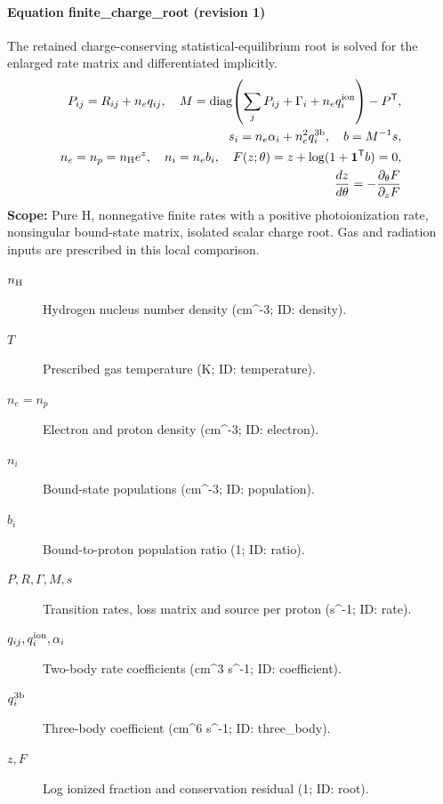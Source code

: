 \paragraph{Equation finite\_charge\_root (revision 1)}
The retained charge-conserving statistical-equilibrium root is solved for the enlarged rate matrix and differentiated implicitly.
\begin{equation}
\begin{aligned}
P_{ij}=R_{ij}+n_e q_{ij},\quad
 M=\operatorname{diag}\!\left(\sum_jP_{ij}+\Gamma_i+n_e q_i^{\rm ion}\right)-P^{\mathsf T},\\
s_i=n_e\alpha_i+n_e^2q_i^{\rm 3b},\quad b=M^{-1}s,\\
n_e=n_p=n_{\rm H}e^z,\quad n_i=n_e b_i,\quad F(z;\theta)=z+\log(1+\mathbf1^{\mathsf T}b)=0,\\
\frac{dz}{d\theta}=-\frac{\partial_\theta F}{\partial_z F}
\end{aligned}
\label{eq:escape.atom_5f_convergence:finite_5f_charge_5f_root:1}
\end{equation}
\noindent\textbf{Scope:} Pure H, nonnegative finite rates with a positive photoionization rate, nonsingular bound-state matrix, isolated scalar charge root. Gas and radiation inputs are prescribed in this local comparison.

\begin{description}
\item[$n_{\rm H}$] Hydrogen nucleus number density (cm\textasciicircum{}-3; ID: density).
\item[$T$] Prescribed gas temperature (K; ID: temperature).
\item[$n_e=n_p$] Electron and proton density (cm\textasciicircum{}-3; ID: electron).
\item[$n_i$] Bound-state populations (cm\textasciicircum{}-3; ID: population).
\item[$b_i$] Bound-to-proton population ratio (1; ID: ratio).
\item[$P,R,\Gamma,M,s$] Transition rates, loss matrix and source per proton (s\textasciicircum{}-1; ID: rate).
\item[$q_{ij},q_i^{\rm ion},\alpha_i$] Two-body rate coefficients (cm\textasciicircum{}3 s\textasciicircum{}-1; ID: coefficient).
\item[$q_i^{\rm 3b}$] Three-body coefficient (cm\textasciicircum{}6 s\textasciicircum{}-1; ID: three\_body).
\item[$z,F$] Log ionized fraction and conservation residual (1; ID: root).
\end{description}

